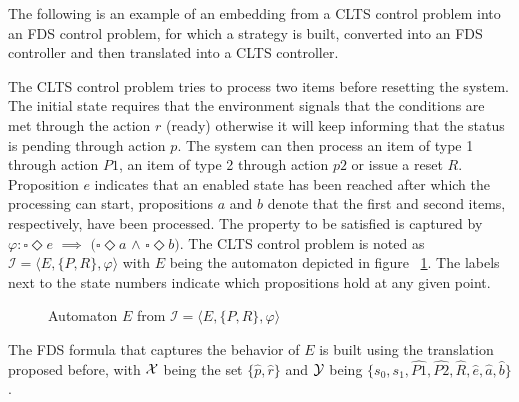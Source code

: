 The following is an example of an embedding from a CLTS control problem into an FDS control problem, for which a strategy is built, converted into an FDS controller and then translated into a CLTS controller. 

The CLTS control problem tries to process two items before resetting the system. The initial state requires that the environment signals that the conditions are met through the action $r$ (ready) otherwise it will keep informing that the status is pending through action $p$.  The system can then process an item of type 1 through action $P1$, an item of type 2 through action $p2$ or issue a reset $R$. Proposition $e$ indicates that an enabled state has been reached after which the processing can start, propositions $a$ and $b$ denote that the first and second items, respectively, have been processed. 
The property to be satisfied is captured by $\varphi: \square \Diamond e$ $\implies$ $(\square \Diamond a$ $\wedge$ $\square \Diamond b)$. The CLTS control problem is noted as $\mathcal{I}=\langle E, \{P,R\}, \varphi \rangle$ with $E$ being the automaton depicted in figure ~\ref{fig:clts_to_fds_E}. The labels next to the state numbers indicate which propositions hold at any given point.

\begin{figure}[bt]
	\centering
	\caption{Automaton $E$ from $\mathcal{I}=\langle E, \{P,R\}, \varphi \rangle$}
	\label{fig:clts_to_fds_E}
\end{figure}

The FDS formula that captures the behavior of $E$ is built using the translation proposed before, with ${\mathcal{X}}$ being the set $\{\hat{p},\hat{r}\}$ and ${\mathcal{Y}}$ being $\{s_0,s_1,\hat{P1},\hat{P2},\hat{R},\hat{e},\hat{a},\hat{b}\}$.

